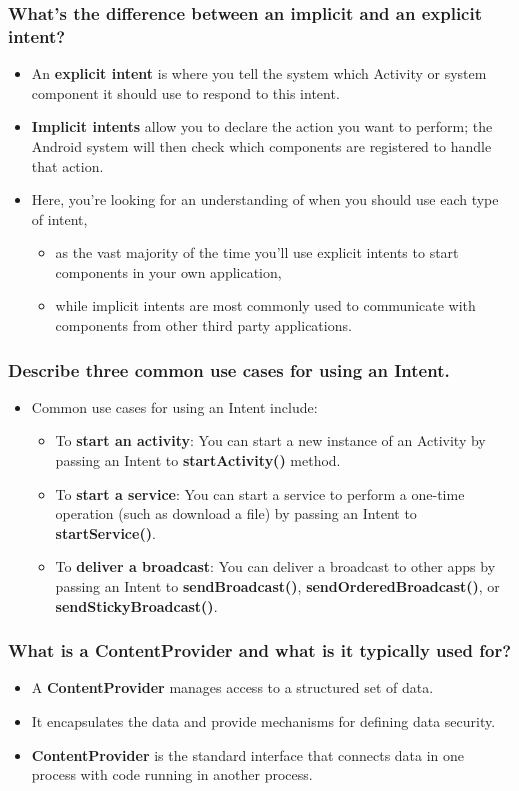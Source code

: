 \documentclass[9pt, b5paper]{article}
\begin{document}
\subsubsection{What's the difference between an implicit and an explicit intent?}
\label{sec-1-3-2}
\begin{itemize}
\item An \textbf{explicit intent} is where you tell the system which Activity or system component it should use to respond to this intent.
\item \textbf{Implicit intents} allow you to declare the action you want to perform; the Android system will then check which components are registered to handle that action.
\item Here, you're looking for an understanding of when you should use each type of intent, 
\begin{itemize}
\item as the vast majority of the time you'll use explicit intents to start components in your own application,
\item while implicit intents are most commonly used to communicate with components from other third party applications.
\end{itemize}
\end{itemize}
\subsubsection{Describe three common use cases for using an Intent.}
\label{sec-1-3-3}
\begin{itemize}
\item Common use cases for using an Intent include:
\begin{itemize}
\item To \textbf{start an activity}: You can start a new instance of an Activity by passing an Intent to \textbf{startActivity()} method.
\item To \textbf{start a service}: You can start a service to perform a one-time operation (such as download a file) by passing an Intent to \textbf{startService()}.
\item To \textbf{deliver a broadcast}: You can deliver a broadcast to other apps by passing an Intent to \textbf{sendBroadcast()}, \textbf{sendOrderedBroadcast()}, or \textbf{sendStickyBroadcast()}.
\end{itemize}
\end{itemize}

\subsubsection{What is a ContentProvider and what is it typically used for?}
\label{sec-1-3-4}
\begin{itemize}
\item A \textbf{ContentProvider} manages access to a structured set of data.
\item It encapsulates the data and provide mechanisms for defining data security.
\item \textbf{ContentProvider} is the standard interface that connects data in one process with code running in another process.
\end{itemize}
\end{document}

